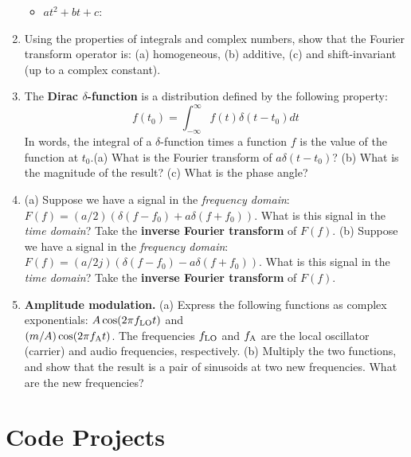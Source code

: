 \documentclass{article}
\begin{document}
\begin{enumerate}
\begin{itemize}
\item $at^2 + bt + c$:
\end{itemize} \vspace{1cm}
\item Using the properties of integrals and complex numbers, show that the Fourier transform operator is: (a) homogeneous, (b) additive, (c) and shift-invariant (up to a complex constant). \\ \vspace{5cm}
\item The \textbf{Dirac $\delta$-function} is a distribution defined by the following property:
\begin{equation}
f(t_0) = \int_{-\infty}^{\infty} f(t) \delta(t-t_0) dt
\end{equation}
In words, the integral of a $\delta$-function times a function $f$ is the value of the function at $t_0$.(a) What is the Fourier transform of $a\delta(t-t_0)$? (b) What is the magnitude of the result? (c) What is the phase angle? \\ \vspace{4cm}
\item (a) Suppose we have a signal in the \textit{frequency domain}: $F(f) = (a/2)(\delta(f-f_0) + a\delta(f+f_0))$.  What is this signal in the \textit{time domain}?  Take the \textbf{inverse Fourier transform} of $F(f)$. (b) Suppose we have a signal in the \textit{frequency domain}: $F(f) = (a/2j)(\delta(f-f_0) - a\delta(f+f_0))$.  What is this signal in the \textit{time domain}?  Take the \textbf{inverse Fourier transform} of $F(f)$. \\ \vspace{4cm}
\item \textbf{Amplitude modulation.} (a) Express the following functions as complex exponentials: $A\cos(2\pi f_{\rm LO} t)$ and \\ $(m/A)\cos(2\pi f_{\rm A} t)$. The frequencies $f_{\rm LO}$ and $f_{\rm A}$ are the local oscillator (carrier) and audio frequencies, respectively.  (b) Multiply the two functions, and show that the result is a pair of sinusoids at two new frequencies.  What are the new frequencies? \\ \vspace{3cm}
\end{enumerate}
\clearpage

\section{Code Projects}
\end{document}
